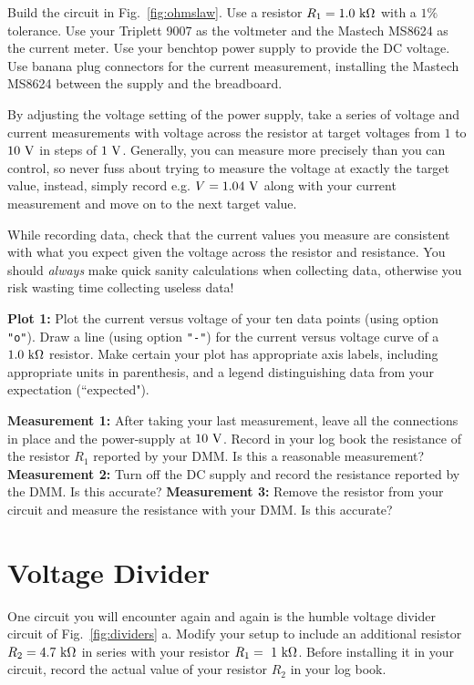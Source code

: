 Build the circuit in Fig.~\ref{fig:ohmslaw}.  Use a resistor $R_1 =
1.0~{\rm k\Omega}$ with a $1\%$ tolerance.  Use your Triplett 9007 as
the voltmeter and the Mastech MS8624 as the current meter.  Use your
benchtop power supply to provide the DC voltage.  Use banana plug
connectors for the current measurement, installing the Mastech MS8624
between the supply and the breadboard.

By adjusting the voltage setting of the power supply, take a series of
voltage and current measurements with voltage across the resistor at
target voltages from $1$ to $10~\rm V$ in steps of $1~\rm V$.
Generally, you can measure more precisely than you can control, so
never fuss about trying to measure the voltage at exactly the target
value, instead, simply record e.g. $V=1.04~\rm V$ along with your
current measurement and move on to the next target value.

While recording data, check that the current values you measure are
consistent with what you expect given the voltage across the resistor
and resistance.  You should {\em always} make quick sanity
calculations when collecting data, otherwise you risk wasting time
collecting useless data!

{\bf Plot 1:} Plot the current versus voltage of your ten data points
(using option {\tt "o"}).  Draw a line (using option {\tt "-"}) for
the current versus voltage curve of a $1.0~\rm k\Omega$ resistor.
Make certain your plot has appropriate axis labels, including
appropriate units in parenthesis, and a legend distinguishing data
from your expectation (``expected").  

{\bf Measurement 1:} After taking your last measurement, leave all the
connections in place and the power-supply at $10~\rm V$.  Record in
your log book the resistance of the resistor $R_1$ reported by your
DMM.  Is this a reasonable measurement?  {\bf Measurement 2:} Turn off
the DC supply and record the resistance reported by the DMM.  Is this
accurate?  {\bf Measurement 3:} Remove the resistor from your circuit
and measure the resistance with your DMM.  Is this accurate?

\section{Voltage Divider}
One circuit you will encounter again and again is the humble voltage
divider circuit of Fig.~\ref{fig:dividers} a.  Modify your setup to
include an additional resistor $R_2 = 4.7~\rm k\Omega$ in series with
your resistor $R_1 = ~\rm 1~\rm k\Omega$.  Before installing it in
your circuit, record the actual value of your resistor $R_2$ in your
log book.

